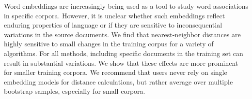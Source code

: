 Word embeddings are increasingly being used as a tool to study word associations in specific corpora. However, it is unclear whether such embeddings reflect enduring properties of language or if they are sensitive to inconsequential variations in the source documents. We find that nearest-neighbor distances are highly sensitive to small changes in the training corpus for a variety of algorithms. For all methods, including specific documents in the training set can result in substantial variations. We show that these effects are more prominent for smaller training corpora. We recommend that users never rely on single embedding models for distance calculations, but rather average over multiple bootstrap samples, especially for small corpora.
